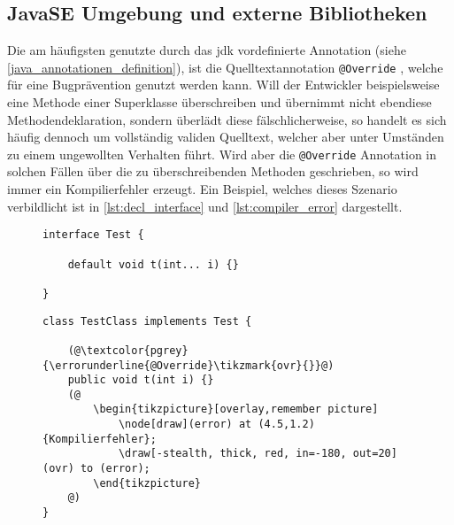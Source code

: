 \subsection{JavaSE Umgebung und externe Bibliotheken}
\label{verwendung_im_umfeld_von_java_se}
Die am häufigsten genutzte durch das \ac{jdk} vordefinierte Annotation (siehe \autoref{java_annotationen_definition}), ist die Quelltextannotation \texttt{@Override} \cite{Rocha2011}, welche für eine Bugprävention genutzt werden kann. Will der Entwickler beispielsweise eine Methode einer Superklasse überschreiben und übernimmt nicht ebendiese Methodendeklaration, sondern überlädt diese fälschlicherweise, so handelt es sich häufig dennoch um vollständig validen Quelltext, welcher aber unter Umständen zu einem ungewollten Verhalten führt. Wird aber die \texttt{@Override} Annotation in solchen Fällen über die zu überschreibenden Methoden geschrieben, so wird immer ein Kompilierfehler erzeugt. Ein Beispiel, welches dieses Szenario verbildlicht ist in \autoref{lst:decl_interface} und \autoref{lst:compiler_error} dargestellt.

\begin{figure}[H]
	\noindent
	\begin{adjustbox}{minipage=[t]{.45\linewidth},gstore totalheight=\heightone,margin=\fboxsep+\fboxrule}
		\begin{lstlisting}[caption=Beispiel -- Interfacedeklaration., captionpos=b, label=lst:decl_interface]
interface Test {

	default void t(int... i) {}

}

		\end{lstlisting}
	\end{adjustbox}\hfill
	\begin{adjustbox}{minipage=[t][\heightone]{0.5\linewidth}}
		\begin{lstlisting}[caption=Beispiel -- Kompilierfehler., captionpos=b, label=lst:compiler_error]
class TestClass implements Test {

	(@\textcolor{pgrey}{\errorunderline{@Override}\tikzmark{ovr}{}}@)
	public void t(int i) {}
	(@
		\begin{tikzpicture}[overlay,remember picture]
			\node[draw](error) at (4.5,1.2) {Kompilierfehler};
			\draw[-stealth, thick, red, in=-180, out=20] (ovr) to (error);
		\end{tikzpicture}
	@)
}
		\end{lstlisting}
	\end{adjustbox}
\end{figure}


